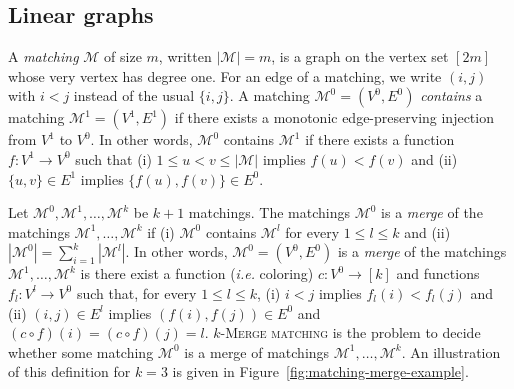 \subsection*{\textbf{Linear graphs}}

A \emph{matching} $\mathcal{M}$ of size $m$, written $|\mathcal{M}| = m$, 
is a graph on the vertex set $[2m]$ whose very vertex has degree one.
For an edge of a matching, we write $(i, j)$ with $i < j$ instead of the usual $\{i, j\}$.
A matching $\mathcal{M}^0 = (V^0, E^0)$ \emph{contains} a matching 
$\mathcal{M}^1 = (V^1, E^1)$ if there exists a monotonic edge-preserving injection from $V^1$ to $V^0$.
In other words, $\mathcal{M}^0$ contains $\mathcal{M}^1$ if there exists a function 
$f : V^1 \to V^0$ such that 
(i) $1 \leq u < v \leq |\mathcal{M}|$ implies $f(u) < f(v)$ and  
(ii) $\{u, v\} \in E^1$ implies $\{f(u), f(v)\} \in E^0$.

Let $\mathcal{M}^0, \mathcal{M}^1, \dots, \mathcal{M}^k$ be $k+1$ matchings.
The matchings $\mathcal{M}^0$ is a \emph{merge} of the matchings 
$\mathcal{M}^1, \dots, \mathcal{M}^k$ 
if 
(i) $\mathcal{M}^0$ contains $\mathcal{M}^l$ for every $1 \leq l \leq k$ 
and (ii) $\left|\mathcal{M}^0\right| = \sum_{i=1}^{k} \left|\mathcal{M}^l\right|$.
In other words,  $\mathcal{M}^0 = (V^0, E^0)$ is a \emph{merge} of the matchings 
$\mathcal{M}^1, \dots, \mathcal{M}^k$ is there exist a function (\emph{i.e.} coloring)
$c : V^0 \to [k]$  and functions $f_l : V^l \to V^0$ such that, for every $1 \leq l \leq k$,
(i) $i < j$ implies $f_l(i) < f_l(j)$ and  
(ii) $(i, j) \in E^l$ implies $(f(i), f(j)) \in E^0$ and $(c \circ f)(i) = (c \circ f)(j) = l$.
\textsc{$k$-Merge matching} is the problem to decide whether some matching 
$\mathcal{M}^0$ is a merge of matchings $\mathcal{M}^1, \dots, \mathcal{M}^k$.
An illustration of this definition for $k = 3$ is given in Figure~\ref{fig:matching-merge-example}.


